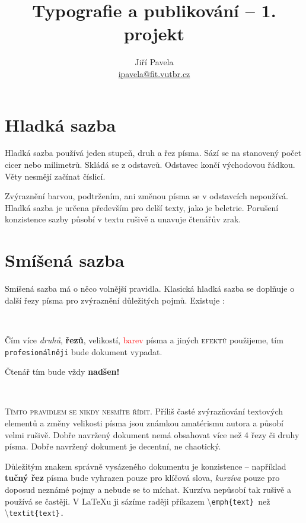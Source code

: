 \documentclass[a4paper,twocolumn, 10pt]{article}
\title{Typografie a publikování – 1. projekt}
\author{Jiří Pavela\\\href{mailto:ipavela@fit.vutbr.cz}{ipavela@fit.vutbr.cz} }
\date{}
\begin{document}
\maketitle

\section{Hladká sazba}

\maketitle
Hladká sazba používá jeden stupeň, druh a řez písma. Sází
se na stanovený počet cicer nebo milimetrů. Skládá se z odstavců. Odstavec končí východovou řádkou. Věty nesmějí
začínat číslicí.

    Zvýraznění barvou, podtržením, ani změnou písma se
v odstavcích nepoužívá. Hladká sazba je určena především
pro delší texty, jako je beletrie. Porušení konzistence sazby
působí v textu rušivě a unavuje čtenářův zrak.

\section{Smíšená sazba}

\maketitle

Smíšená sazba má o něco volnější pravidla. Klasická hladká
sazba se doplňuje o další řezy písma pro zvýraznění důležitých pojmů. Existuje :

~\

Čím více \textit{druhů}, \textbf{řezů}, {\tiny velikostí}, \textcolor{red}{barev} písma a jiných \textsc{efektů} použijeme, tím
\texttt{profesionálněji} bude {\large dokument} vypadat.

{\huge Č}{\LARGE t}{\Large e}{\large n}á{\small ř} {\footnotesize t}{\scriptsize í}{\tiny m} bude vždy \textbf{\Huge nadšen!}

~\

\textsc{Tímto pravidlem se nikdy nesmíte řídit.} Příliš
časté zvýrazňování textových elementů a změny velikosti
písma jsou známkou amatérismu autora a působí velmi rušivě. Dobře navržený dokument nemá obsahovat více než
4 řezy či druhy písma. Dobře navržený dokument je decentní, ne chaotický.

Důležitým znakem správně vysázeného dokumentu je
konzistence – například \textbf{tučný řez} písma bude vyhrazen
pouze pro klíčová slova, \textit{kurzíva} pouze pro doposud neznámé pojmy a nebude se to míchat. Kurzíva nepůsobí
tak rušivě a používá se častěji. V \LaTeX u ji sázíme raději
příkazem \textbackslash \texttt{emph\{text\}\ }než \textbackslash \texttt{textit\{text\}.\ }
\end{document}
